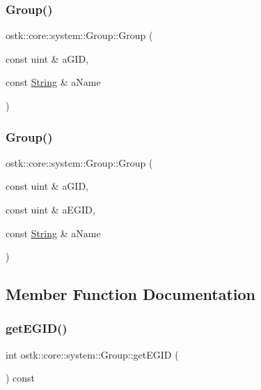 \subsubsection{\texorpdfstring{Group()}{Group()}\hspace{0.1cm}{\footnotesize\ttfamily [1/2]}}
{\footnotesize\ttfamily ostk\+::core\+::system\+::\+Group\+::\+Group (\begin{DoxyParamCaption}\item[{const uint \&}]{a\+G\+ID,  }\item[{const \hyperlink{classostk_1_1core_1_1types_1_1_string}{String} \&}]{a\+Name }\end{DoxyParamCaption})}

\mbox{\label{classostk_1_1core_1_1system_1_1_group_a0fea739e63a33287a75d34304c4e1aa4}} 
\subsubsection{\texorpdfstring{Group()}{Group()}\hspace{0.1cm}{\footnotesize\ttfamily [2/2]}}
{\footnotesize\ttfamily ostk\+::core\+::system\+::\+Group\+::\+Group (\begin{DoxyParamCaption}\item[{const uint \&}]{a\+G\+ID,  }\item[{const uint \&}]{a\+E\+G\+ID,  }\item[{const \hyperlink{classostk_1_1core_1_1types_1_1_string}{String} \&}]{a\+Name }\end{DoxyParamCaption})}



\subsection{Member Function Documentation}
\mbox{\label{classostk_1_1core_1_1system_1_1_group_a4a3d6eaf4892cd330be48522e38b41f1}} 
\subsubsection{\texorpdfstring{get\+E\+G\+I\+D()}{getEGID()}}
{\footnotesize\ttfamily int ostk\+::core\+::system\+::\+Group\+::get\+E\+G\+ID (\begin{DoxyParamCaption}{ }\end{DoxyParamCaption}) const}


